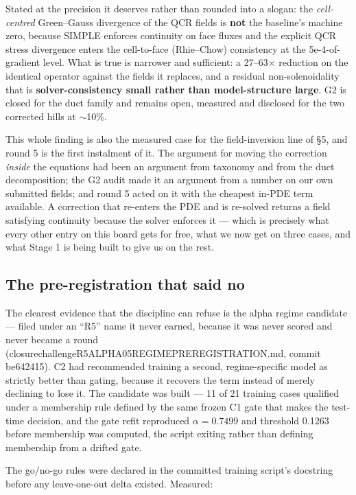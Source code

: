 \documentclass[11pt,a4paper]{article}
\newcommand{\breakus}{\textunderscore\allowbreak}
\newcommand{\code}[1]{{\small\ttfamily\let\_\breakus #1}}
\newcommand{\artifact}[1]{{\footnotesize\ttfamily\let\_\breakus #1}}
\begin{document}
\noindent Stated at the precision it deserves rather than rounded into a slogan: the
\emph{cell-centred} Green--Gauss divergence of the QCR fields is \textbf{not} the baseline's
machine zero, because SIMPLE enforces continuity on face fluxes and the explicit QCR stress
divergence enters the cell-to-face (Rhie--Chow) consistency at the 5e-4-of-gradient level.
What is true is narrower and sufficient: a 27--63$\times$ reduction on the identical
operator against the fields it replaces, and a residual non-solenoidality that is
\textbf{solver-consistency small rather than model-structure large}. G2 is closed for the
duct family and remains open, measured and disclosed for the two corrected hills at
$\sim$10\%.

This whole finding is also the measured case for the field-inversion line of \S5, and round
5 is the first instalment of it. The argument for moving the correction \emph{inside} the
equations had been an argument from taxonomy and from the duct decomposition; the G2 audit
made it an argument from a number on our own submitted fields; and round 5 acted on it with
the cheapest in-PDE term available. A correction that re-enters the PDE and is re-solved
returns a field satisfying continuity because the solver enforces it --- which is precisely
what every other entry on this board gets for free, what we now get on three cases, and
what Stage 1 is being built to give us on the rest.

\subsection{The pre-registration that said no}
\label{sec:nogo}

The clearest evidence that the discipline can refuse is the \code{alpha\_05} regime
candidate --- filed under an ``R5'' name it never earned, because it was never scored and
never became a round
(\artifact{closure\_challenge\_R5\_ALPHA05\_REGIME\_PREREGISTRATION.md},
commit \code{be642415}). C2 had recommended training a second, regime-specific model as
strictly better than gating, because it recovers the term instead of merely declining to
lose it. The candidate was built --- 11 of 21 training cases qualified under a membership
rule defined by the same frozen C1 gate that makes the test-time decision, and the gate
refit reproduced $\alpha = 0.7499$ and threshold 0.1263 before membership was computed, the
script exiting rather than defining membership from a drifted gate.

The go/no-go rules were declared in the committed training script's docstring before any
leave-one-out delta existed. Measured:
\end{document}
